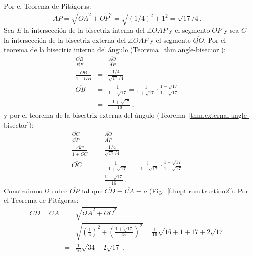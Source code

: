 Por el Teorema de Pitágoras:
\[
\overline{AP}=\sqrt{\overline{OA}^2+\overline{OP}^2}=\sqrt{(1/4)^2+1^2}=\sqrt{17}/4\,.
\]
Sea $B$ la intersección de la bisectriz interna del $\angle OAP$ y el segmento $\overline{OP}$ y sea $C$ la intersección de la bisectriz externa del $\angle OAP$ y el segmento $\overline{QO}$. Por el teorema de la bisectriz interna del ángulo (Teorema~\ref{thm.angle-bisector}):
\begin{eqnarray*}
\frac{\overline{OB}}{\overline{BP}}&=&\frac{\overline{AO}}{\overline{AP}}\\
\frac{\overline{OB}}{1-\overline{OB}}&=&\frac{1/4}{\sqrt{17}/{4}}\\
\overline{OB}&=&\frac{1}{1+\sqrt{17}}=\frac{1}{1+\sqrt{17}}\cdot \frac{1-\sqrt{17}}{1-\sqrt{17}}\\
&=&\frac{-1+\sqrt{17}}{16}\,,
\end{eqnarray*}
y por el teorema de la bisectriz externa del ángulo (Teorema~\ref{thm.external-angle-bisector}):
\begin{eqnarray*}
\frac{\overline{OC}}{\overline{CP}}&=&\frac{\overline{AO}}{\overline{AP}}\\
\frac{\overline{OC}}{1+\overline{OC}}&=&\frac{1/4}{\sqrt{17}/{4}}\\
\overline{OC}&=&\frac{1}{-1+\sqrt{17}}=\frac{1}{-1+\sqrt{17}}\cdot \frac{1+\sqrt{17}}{1+\sqrt{17}}\\
&=&\frac{1+\sqrt{17}}{16}\,.
\end{eqnarray*}
Construimos $D$ sobre $\overline{OP}$ tal que $\overline{CD}=\overline{CA}=a$ (Fig.~\ref{f.hept-construction2}). Por el Teorema de Pitágoras:
\begin{eqnarray*}
\overline{CD}=\overline{CA}&=&\sqrt{\overline{OA}^2+\overline{OC}^2}\\
&=&\sqrt{\left(\frac{1}{4}\right)^2+\left(\frac{1+\sqrt{17}}{16}\right)^2}=\frac{1}{16}\sqrt{16+1+17+2\sqrt{17}}\\
&=&\frac{1}{16}\sqrt{34+2\sqrt{17}}\,.
\end{eqnarray*}

